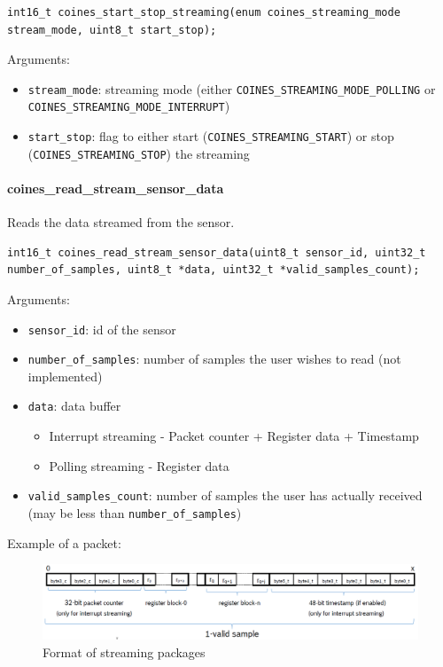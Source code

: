 \begin{lstlisting}
int16_t coines_start_stop_streaming(enum coines_streaming_mode stream_mode, uint8_t start_stop);
\end{lstlisting}

Arguments:
\begin{itemize}
	\item \texttt{stream\_mode}: streaming mode (either \texttt{COINES\_STREAMING\_MODE\_POLLING} or \\ \texttt{COINES\_STREAMING\_MODE\_INTERRUPT})
	\item \texttt{start\_stop}: flag to either start (\texttt{COINES\_STREAMING\_START}) or stop (\texttt{COINES\_STREAMING\_STOP}) the streaming
\end{itemize}

\paragraph{coines\_read\_stream\_sensor\_data}\label{coinesReadStreamSensorData}
Reads the data streamed from the sensor.

\begin{lstlisting}
int16_t coines_read_stream_sensor_data(uint8_t sensor_id, uint32_t number_of_samples, uint8_t *data, uint32_t *valid_samples_count);
\end{lstlisting}

Arguments:
\begin{itemize}
	\item \texttt{sensor\_id}: id of the sensor 
	\item \texttt{number\_of\_samples}: number of samples the user wishes to read (not implemented)
	\item \texttt{data}: data buffer
	\begin{itemize} 
	   \item Interrupt streaming - Packet counter + Register data + Timestamp
	   \item Polling streaming - Register data
	\end{itemize}
	\item \texttt{valid\_samples\_count}: number of samples the user has actually received (may be less than \texttt{number\_of\_samples})
\end{itemize}

Example of a packet:

\begin{figure}[h]
	\includegraphics[width=\textwidth]{coinesAPI_images/COINES_streamingSample}
	\caption{Format of streaming packages}
\end{figure}

